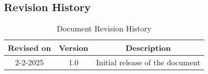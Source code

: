 \subsection{Revision History}
\begin{table}[H]
    \centering
    \begin{tabular}{|c|c|c|}
        \hline
        \textbf{Revised on} & \textbf{Version} & \textbf{Description}\\ \hline
        2-2-2025 & 1.0     & Initial release of the document \\ \hline
    \end{tabular}
    \caption{Document Revision History}
    \label{tab:revision_history_table}
\end{table}